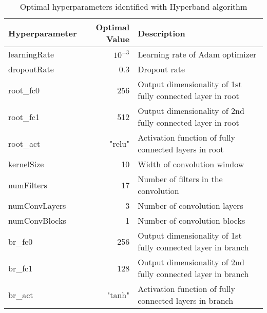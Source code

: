 \begin{table}[h]
  \centering
  \begin{tabular}{lrp{5.5cm}}
    \hline
    \textbf{Hyperparameter}   & \textbf{Optimal Value} & \textbf{Description}                \\
    \hline
    learningRate  & $10^{-3}$ & Learning rate of Adam optimizer                              \\
    dropoutRate   & 0.3       & Dropout rate                                                 \\
    root\_fc0     & 256       & Output dimensionality of 1st fully connected layer in root   \\
    root\_fc1     & 512       & Output dimensionality of 2nd fully connected layer in root   \\
    root\_act     & "relu"    & Activation function of fully connected layers in root        \\
    kernelSize    & 10        & Width of convolution window                                  \\
    numFilters    & 17        & Number of filters in the convolution                         \\
    numConvLayers & 3         & Number of convolution layers                                 \\
    numConvBlocks & 1         & Number of convolution blocks                                 \\
    br\_fc0       & 256       & Output dimensionality of 1st fully connected layer in branch \\
    br\_fc1       & 128       & Output dimensionality of 2nd fully connected layer in branch \\
    br\_act       & "tanh"    & Activation function of fully connected layers in branch      \\
    \hline
  \end{tabular}
  \caption{Optimal hyperparameters identified with Hyperband algorithm}
  \label{si_table17}
\end{table}


